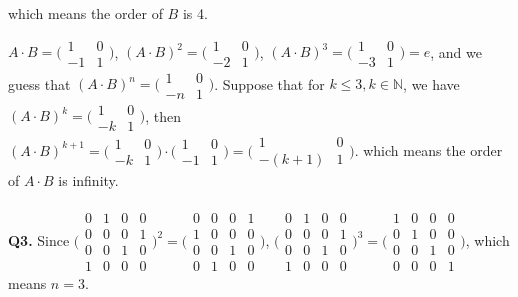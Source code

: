 \documentclass{article}[12pt]
\begin{document}
which means the order of $B$ is 4.
\par
$A\cdot B=\bigl( \begin{smallmatrix} 1& 0 \\ -1 & 1 \end{smallmatrix} \bigr)$, $(A\cdot B)^2=\bigl( \begin{smallmatrix} 1 & 0 \\ -2 & 1\end{smallmatrix} \bigr)$, $(A\cdot B)^3=\bigl( \begin{smallmatrix} 1 & 0 \\ -3 &1\end{smallmatrix} \bigr)=e$, and we guess that $(A\cdot B)^n=\bigl( \begin{smallmatrix} 1 & 0 \\ -n &1\end{smallmatrix} \bigr)$. Suppose that for $k\leq 3,k\in \mathbb{N}$, we have $(A\cdot B)^k=\bigl( \begin{smallmatrix} 1 & 0 \\ -k &1\end{smallmatrix} \bigr)$, then
$(A\cdot B)^{k+1} =\bigl( \begin{smallmatrix} 1 & 0 \\ -k &1\end{smallmatrix} \bigr)\cdot \bigl( \begin{smallmatrix} 1& 0 \\ -1 & 1 \end{smallmatrix} \bigr)=\bigl( \begin{smallmatrix} 1 & 0 \\ -(k+1) &1\end{smallmatrix} \bigr)$.
which means the order of $A\cdot B$ is infinity. 
\\ \\
\noindent \textbf{Q3.}
Since $( \begin{smallmatrix} 0 & 1 &0&0\\ 0 & 0&0&1\\0&0&1&0\\1&0&0&0 \end{smallmatrix} \bigr)^2=( \begin{smallmatrix} 0 & 0 &0&1\\ 1 & 0&0&0\\0&0&1&0\\0&1&0&0 \end{smallmatrix} \bigr)$, $( \begin{smallmatrix} 0 & 1 &0&0\\ 0 & 0&0&1\\0&0&1&0\\1&0&0&0 \end{smallmatrix} \bigr)^3=( \begin{smallmatrix} 1 & 0 &0&0\\ 0 & 1&0&0\\0&0&1&0\\0&0&0&1 \end{smallmatrix} \bigr)$, which means $n=3$.
\\ 
\end{document}
